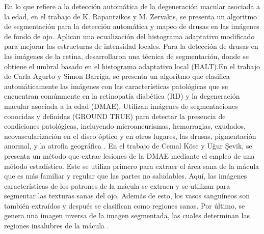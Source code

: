 En lo que refiere a la detecci\'on autom\'atica de la degeneraci\'on macular asociada a la edad, en el trabajo de K. Rapantzikos y  M. Zervakis, se presenta un algoritmo de segmentaci\'on para la detecci\'on autom\'atica y mapeo de drusas en las im\'agenes de fondo de ojo. Aplican una ecualizaci\'on del histograma adaptativo modificado para mejorar las estructuras de intensidad locales. Para la detecci\'on de drusas en las im\'agenes de la retina, desarrollaron una t\'ecnica de segmentaci\'on, donde se obtiene el umbral basado en el histograma adaptativo local (HALT)\cite{rapantzikos2003detection}.En el trabajo de Carla Agurto y Simon Barriga, se presenta un algoritmo que clasifica autom\'aticamente las im\'agenes con las caracter\'isticas patol\'ogicas que se encuentran com\'unmente en la retinopat\'ia diab\'etica (RD) y la degeneraci\'on macular asociada a la edad (DMAE). Utilizan im\'agenes de segmentaciones conocidas y definidas (GROUND TRUE) para detectar la presencia de condiciones patol\'ogicas, incluyendo microaneurismas, hemorragias, exudados, neovascularización en el disco \'optico y en otros lugares, las drusas, pigmentaci\'on anormal, y la atrofia geogr\'afica \cite{agurto2011automatic}. En el trabajo de Cemal Köse y Uğur Şevik, se presenta un m\'etodo que extrae lesiones de la DMAE mediante el empleo de una m\'etodo estad\'istico. Este se utiliza primero para extraer el \'area sana de la m\'acula que es m\'as familiar y regular que las partes no saludables. Aqu\'i, las im\'agenes caracter\'isticas de los patrones de la m\'acula se extraen y se utilizan para segmentar las texturas sanas del ojo. Adem\'as de esto, los vasos sangu\'ineos son tambi\'en extra\'idos y despu\'es se clasifican como regiones sanas. Por \'ultimo, se genera una imagen inversa de la imagen segmentada, las cuales determinan las regiones insalubres de la m\'acula \cite{kose2010statistical} \cite{kose2008automatic}. 

